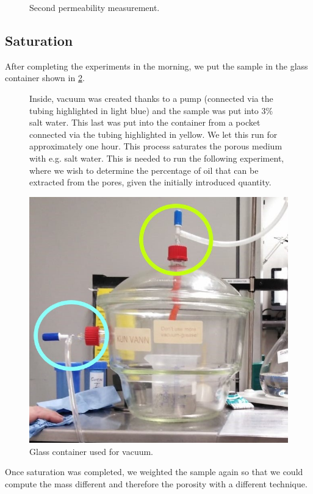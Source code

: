 \documentclass[10pt, a4paper]{amsart}
\begin{document}
\begin{figure}[!h]
\begin{minipage}{0.5\textwidth}
        \label{f:perm2_detail}
    \end{minipage}
    \caption{Second permeability measurement.}
\end{figure}

\subsection{Saturation}
After completing the experiments in the morning, we put the sample in the glass container shown in \cref{f:essicatore}.

\begin{figure}[H]
    \centering
    \begin{minipage}{0.45\textwidth}
        Inside, vacuum was created thanks to a pump (connected via the tubing highlighted in light blue) and the sample was put into $3\%$ salt water. This last was put into the container from a pocket connected via the tubing highlighted in yellow.  We let this run for approximately one hour. This process saturates the porous medium with e.g. salt water. This is needed to run the following experiment, where we wish to determine the percentage of oil that can be extracted from the pores, given the initially introduced quantity.
    \end{minipage}\hfill
    \begin{minipage}{0.5\textwidth}
    \centering
        \includegraphics[width=\textwidth]{essicatore_det.jpeg}
        \caption{Glass container used for vacuum.}
    \label{f:essicatore}
    \end{minipage}
\end{figure}
Once saturation was completed, we weighted the sample again so that we could compute the mass different and therefore the porosity with a different technique.
\end{document}
